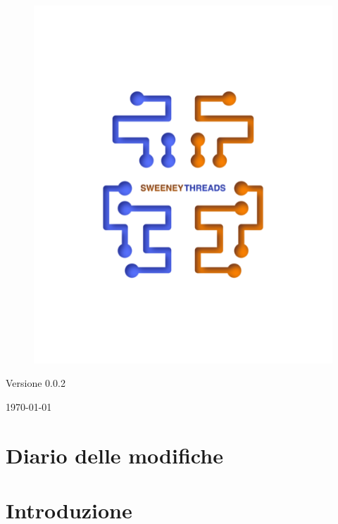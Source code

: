 \documentclass[a4paper]{article}
\begin{document}
\begin{titlepage}
		\begin{figure}[H]
			\centering
			\includegraphics[scale=0.8]{sweeney.png}
		\end{figure}
		\begin{center}
			Versione 0.0.2
		\end{center}
		{\large \today} \\ [3cm] 
		\vfill  
	\end{titlepage}
	
	
	\tableofcontents
	
	\newpage 
	\section*{Diario delle modifiche}

	\newpage \section{Introduzione}
\end{document}
